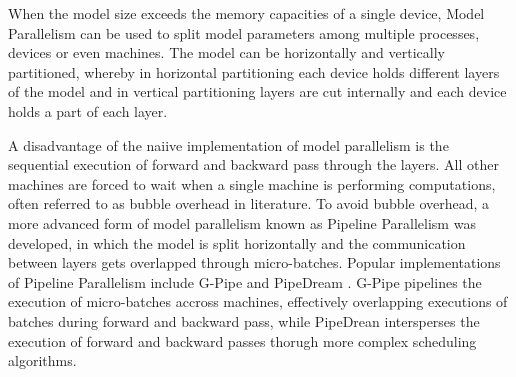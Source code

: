When the model size exceeds the memory capacities of a single device, Model Parallelism 
\cite*{https://doi.org/10.48550/arXiv.1811.02084, https://doi.org/10.48550/arXiv.1909.08053} can be used to split model 
parameters among multiple processes, devices or even machines. The model can be horizontally and vertically partitioned, 
whereby in horizontal partitioning each device holds different layers of the model and in vertical partitioning layers 
are cut internally and each device holds a part of each layer.

A disadvantage of the naiive implementation of model parallelism is the sequential execution of forward and backward pass 
through the layers. All other machines are forced to wait when a single machine is performing computations, often referred to 
as bubble overhead in literature. To avoid bubble overhead, a more advanced form of model parallelism known as Pipeline Parallelism
was developed, in which the model is split horizontally and the communication between layers gets overlapped through micro-batches. 
Popular implementations of Pipeline Parallelism include G-Pipe \cite*{https://doi.org/10.48550/arXiv.1811.06965} and 
PipeDream \cite*{https://doi.org/10.48550/arXiv.1806.03377}. G-Pipe pipelines the execution of micro-batches accross machines, 
effectively overlapping executions of batches during forward and backward pass, while PipeDrean intersperses the execution of 
forward and backward passes thorugh more complex scheduling algorithms. 

